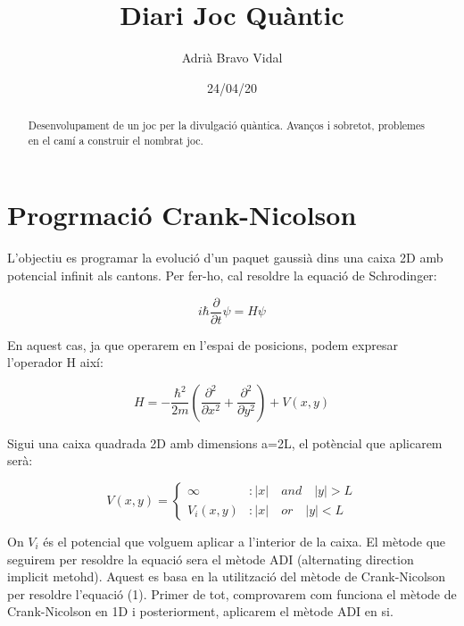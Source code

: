 \documentclass{article}
\begin{document}
	\title{Diari Joc Quàntic}
	\author{Adrià Bravo Vidal}
	\date{24/04/20}
	\maketitle	
	
\renewcommand{\abstractname}{Introducció}	
\begin{abstract}
	Desenvolupament de un joc per la divulgació quàntica. Avanços i sobretot, problemes en el camí a construir el nombrat joc.
\end{abstract}
\tableofcontents

\section{Progrmació Crank-Nicolson}

L'objectiu es programar la evolució d'un paquet gaussià dins una caixa 2D amb potencial infinit als cantons. Per fer-ho, cal resoldre la equació de 
Schrodinger:

\begin{equation}
i\hbar\frac{\partial}{\partial t}\psi=H\psi
\end{equation}

En aquest cas, ja que operarem en l'espai de posicions, podem expresar l'operador H així:

\begin{equation}
H=-\frac{\hbar^2}{2m}(\frac{\partial^2}{\partial x^2}+\frac{\partial^2}{\partial y^2}) + V(x,y)
\end{equation}

Sigui una caixa quadrada 2D amb dimensions a=2L, el potèncial que aplicarem serà:

\begin{equation}
V(x,y) = \left\{
\begin{array}{lr}
\infty & : |x|\quad and\quad |y| > L\\
V_i(x,y) & : |x|\quad or\quad |y|< L 
\end{array}
\right.
\end{equation}

On \(V_i\) és el potencial que volguem aplicar a l'interior de la caixa. El mètode que seguirem per resoldre la equació sera el mètode ADI (alternating
direction implicit metohd). Aquest es basa en la utilització del mètode de Crank-Nicolson per resoldre l'equació (1). Primer de tot, comprovarem com funciona el mètode de Crank-Nicolson en 1D i posteriorment, aplicarem el mètode ADI en si.
\end{document}
